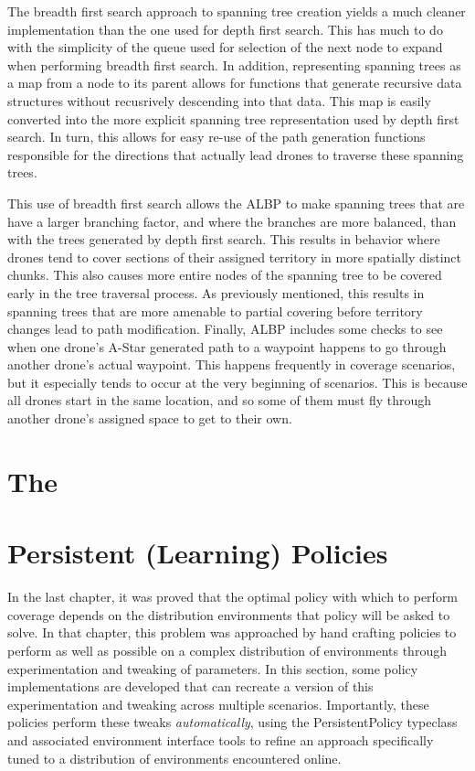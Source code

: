The breadth first search approach to spanning tree creation yields a much cleaner implementation than the one used for depth first search. This has much to do with the simplicity of the queue used for selection of the next node to expand when performing breadth first search. In addition, representing spanning trees as a map from a node to its parent allows for functions that generate recursive data structures without recusrively descending into that data. This map is easily converted into the more explicit spanning tree representation used by depth first search. In turn, this allows for easy re-use of the path generation functions responsible for the directions that actually lead drones to traverse these spanning trees.

This use of breadth first search allows the ALBP to make spanning trees that are have a larger branching factor, and where the branches are more balanced, than with the trees generated by depth first search. This results in behavior where drones tend to cover sections of their assigned territory in more spatially distinct chunks. This also causes more entire nodes of the spanning tree to be covered early in the tree traversal process. As previously mentioned, this results in spanning trees that are more amenable to partial covering before territory changes lead to path modification. Finally, ALBP includes some checks to see when one drone's A-Star generated path to a waypoint happens to go through another drone's actual waypoint. This happens frequently in coverage scenarios, but it especially tends to occur at the very beginning of scenarios. This is because all drones start in the same location, and so some of them must fly through another drone's assigned space to get to their own.

\section{The }


\section{Persistent (Learning) Policies}

In the last chapter, it was proved that the optimal policy with which to perform coverage depends on the distribution environments that policy will be asked to solve. In that chapter, this problem was approached by hand crafting policies to perform as well as possible on a complex distribution of environments through experimentation and tweaking of parameters. In this section, some policy implementations are developed that can recreate a version of this experimentation and tweaking across multiple scenarios. Importantly, these policies perform these tweaks \textit{automatically}, using the PersistentPolicy typeclass and associated environment interface tools to refine an approach specifically tuned to a distribution of environments encountered online.

